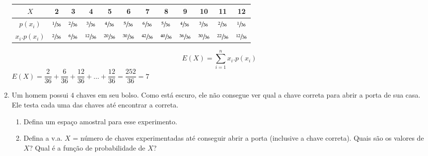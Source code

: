 \begin{enumerate}
{		\begin{center}
		\begin{tabular}{|c|c|c|c|c|c|c|c|c|c|c|c|}
		\hline
			$X$       & 2             & 3             & 4             & 5             & 6             & 7             & 8             & 9             & 10            & 11            & 12            \\ \hline
			$p(x_{i})$ & $\sfrac{1}{36}$ & $\sfrac{2}{36}$ & $\sfrac{3}{36}$ & $\sfrac{4}{36}$ & $\sfrac{5}{36}$ & $\sfrac{6}{36}$ & $\sfrac{5}{36}$ & $\sfrac{4}{36}$ & $\sfrac{3}{36}$ & $\sfrac{2}{36}$ & $\sfrac{1}{36}$ \\ \hline
			$x_{i}.p(x_{i})$ & $\sfrac{2}{36}$ & $\sfrac{6}{36}$ & $\sfrac{12}{36}$ & $\sfrac{20}{36}$ & $\sfrac{30}{36}$ & $\sfrac{42}{36}$ & $\sfrac{40}{36}$ & $\sfrac{36}{36}$ & $\sfrac{30}{36}$ & $\sfrac{22}{36}$ & $\sfrac{12}{36}$ \\ \hline
		\end{tabular}
		\end{center}
		
		\begin{equation*}
			{E(X) = \sum^{n}_{i=1} x_{i}.p(x_{i})}
		\end{equation*}
		$E(X) = \dfrac{2}{36} + \dfrac{6}{36} + \dfrac{12}{36} + \ldots + \dfrac{12}{36} = \dfrac{252}{36} = 7$
	}
	
\item Um homem possui $4$ chaves em seu bolso. Como está escuro, ele não consegue ver qual a
chave correta para abrir a porta de sua casa. Ele testa cada uma das chaves até encontrar a
correta.

	
	\begin{enumerate}[label=\alph*)]
		\item Defina um espaço amostral para esse experimento.
		
		\item Defina a v.a. $X$ = número de chaves experimentadas até conseguir abrir a porta (inclusive a chave correta). Quais são os valores de $X$? Qual é a função de probabilidade de $X$?
		

\end{enumerate}
\end{enumerate}
